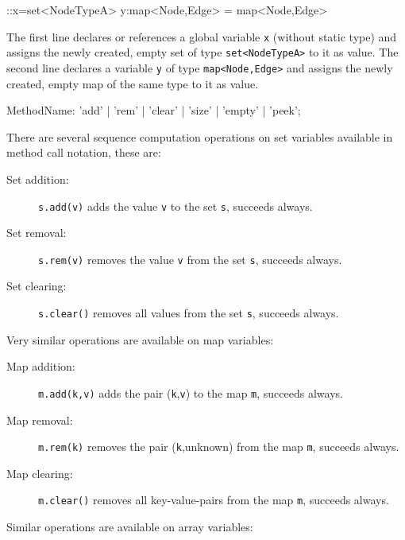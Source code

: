 \begin{example}
\begin{grgen}
::x=set<NodeTypeA>{}
y:map<Node,Edge> = map<Node,Edge>{}
\end{grgen}
The first line declares or references a global variable \texttt{x} (without static type) and assigns the newly created, empty set of type \texttt{set<NodeTypeA>} to it as value.
The second line declares a variable \texttt{y} of type \texttt{map<Node,Edge>} and assigns the newly created, empty map of the same type to it as value.
\end{example}

\begin{rail}
  MethodName: 'add' | 'rem' | 'clear' | 'size' | 'empty' | 'peek';
\end{rail}

\noindent There are several sequence computation operations on set variables available in method call notation, these are:

\begin{description}
\item[Set addition:] \texttt{s.add(v)} adds the value \texttt{v} to the set \texttt{s}, succeeds always.
\item[Set removal:] \texttt{s.rem(v)} removes the value \texttt{v} from the set \texttt{s}, succeeds always.
\item[Set clearing:] \texttt{s.clear()} removes all values from the set \texttt{s}, succeeds always.
\end{description}

\noindent Very similar operations are available on map variables:

\begin{description}
\item[Map addition:] \texttt{m.add(k,v)} adds the pair (\texttt{k},\texttt{v}) to the map \texttt{m}, succeeds always.
\item[Map removal:] \texttt{m.rem(k)} removes the pair (\texttt{k},unknown) from the map \texttt{m}, succeeds always.
\item[Map clearing:] \texttt{m.clear()} removes all key-value-pairs from the map \texttt{m}, succeeds always.
\end{description}

\noindent Similar operations are available on array variables:

